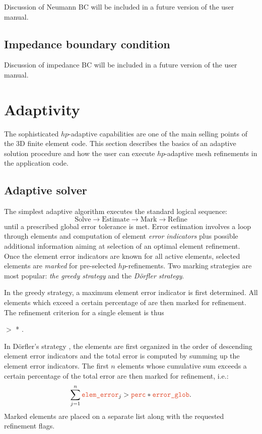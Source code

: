 Discussion of Neumann BC will be included in a future version of the user manual.

\subsection{Impedance boundary condition}
\label{sec:impedance}

Discussion of impedance BC will be included in a future version of the user manual.

\section{Adaptivity}
\label{sec:adaptivity}

The sophisticated $hp$-adaptive capabilities are one of the main selling points of the \hp3D finite element code. This section describes the basics of an adaptive solution procedure and how the user can execute $hp$-adaptive mesh refinements in the application code.

\subsection{Adaptive solver}
\label{sec:adaptive-solver}

The simplest adaptive algorithm executes the standard logical sequence:
\[
	\text{Solve} \longrightarrow
	\text{Estimate} \longrightarrow
	\text{Mark} \longrightarrow
	\text{Refine} 
\]
until a prescribed global error tolerance is met. Error estimation involves a loop through elements and computation of element {\em error indicators} plus possible additional information aiming at selection of an optimal element refinement. Once the element error indicators are known for all active elements, selected elements are {\em marked} for pre-selected $hp$-refinements. Two marking strategies are most popular: {\em the greedy strategy} and the {\em D\"orfler strategy}. 

In the greedy strategy, a maximum element error indicator  is first determined. All elements which exceed a certain percentage of  are then marked for refinement. The refinement criterion for a single element is thus
\begin{center}
	 $>$  .
\end{center}

In D\"orfler's strategy \cite{dorfler1996marking}, the elements are first organized in the order of descending element error indicators and the total error  is computed by summing up the element error indicators. The first $n$ elements whose cumulative sum exceeds a certain percentage of the total error are then marked for refinement, i.e.:
\[
\sum_{j=1}^n \var{elem\_error}_j > \var{perc} * \var{error\_glob} .
\]
Marked elements are placed on a separate list along with the requested refinement flags.

